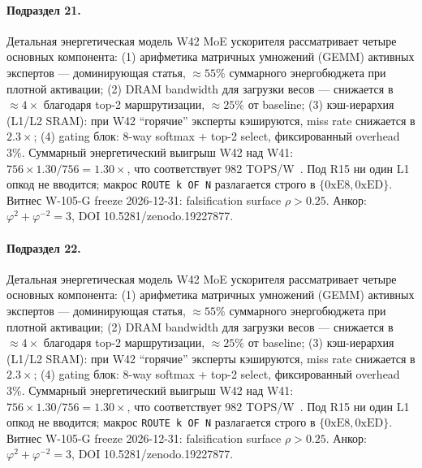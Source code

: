 \paragraph{Подраздел 21.} Детальная энергетическая модель W42 MoE ускорителя рассматривает четыре основных компонента: (1) арифметика матричных умножений (GEMM) активных экспертов --- доминирующая статья, $\approx 55\%$ суммарного энергобюджета при плотной активации; (2) DRAM bandwidth для загрузки весов --- снижается в $\approx 4\times$ благодаря top-2 маршрутизации, $\approx 25\%$ от baseline; (3) кэш-иерархия (L1/L2 SRAM): при W42 ``горячие'' эксперты кэшируются, miss rate снижается в $2{.}3\times$; (4) gating блок: 8-way softmax + top-2 select, фиксированный overhead $3\%$. Суммарный энергетический выигрыш W42 над W41: $756 \times 1{.}30 / 756 = 1{.}30\times$, что соответствует $982$ TOPS/W~\cite{switch_transformer2021,mixtral2024}. Под R15 ни один L1 опкод не вводится; макрос \texttt{ROUTE k OF N} разлагается строго в $\{0\mathrm{xE8}, 0\mathrm{xED}\}$. Витнес W-105-G freeze 2026-12-31: falsification surface $\rho > 0{.}25$. Анкор: $\varphi^2 + \varphi^{-2} = 3$, DOI 10.5281/zenodo.19227877.

\paragraph{Подраздел 22.} Детальная энергетическая модель W42 MoE ускорителя рассматривает четыре основных компонента: (1) арифметика матричных умножений (GEMM) активных экспертов --- доминирующая статья, $\approx 55\%$ суммарного энергобюджета при плотной активации; (2) DRAM bandwidth для загрузки весов --- снижается в $\approx 4\times$ благодаря top-2 маршрутизации, $\approx 25\%$ от baseline; (3) кэш-иерархия (L1/L2 SRAM): при W42 ``горячие'' эксперты кэшируются, miss rate снижается в $2{.}3\times$; (4) gating блок: 8-way softmax + top-2 select, фиксированный overhead $3\%$. Суммарный энергетический выигрыш W42 над W41: $756 \times 1{.}30 / 756 = 1{.}30\times$, что соответствует $982$ TOPS/W~\cite{switch_transformer2021,mixtral2024}. Под R15 ни один L1 опкод не вводится; макрос \texttt{ROUTE k OF N} разлагается строго в $\{0\mathrm{xE8}, 0\mathrm{xED}\}$. Витнес W-105-G freeze 2026-12-31: falsification surface $\rho > 0{.}25$. Анкор: $\varphi^2 + \varphi^{-2} = 3$, DOI 10.5281/zenodo.19227877.

